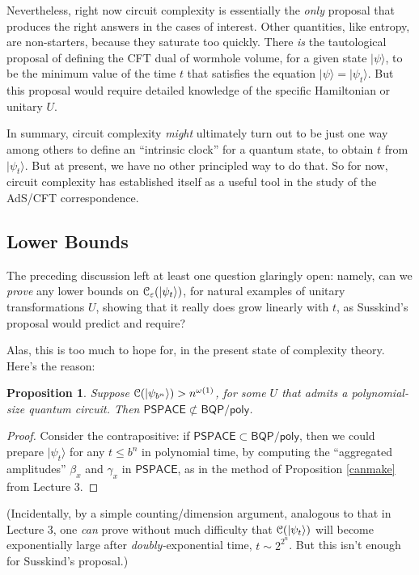 \documentclass[11pt]{report}
\theoremstyle{plain}
\newtheorem{proposition}[theorem]{Proposition}
\theoremstyle{definition}
\newcommand{\eps}{\varepsilon}
\renewcommand{\ket}[1]{|#1\rangle}
\begin{document}
Nevertheless, right now circuit complexity is essentially the {\em only} proposal that produces the right answers in the cases of interest.  Other quantities, like entropy, are non-starters, because they saturate too quickly.  There {\em is} the tautological proposal of defining the CFT dual of wormhole volume, for a given state $\ket{\psi}$, to be the minimum value of the time $t$ that satisfies the equation $\ket{\psi}=\ket{\psi_t}$.  But this proposal would require detailed knowledge of the specific Hamiltonian or unitary $U$.

In summary, circuit complexity {\em might} ultimately turn out to be just one way among others to define an ``intrinsic clock'' for a quantum state, to obtain $t$ from $\ket{\psi_t}$.  But at present, we have no other principled way to do that.  So for now, circuit complexity has established itself as a useful tool in the study of the AdS/CFT correspondence.

\subsection{Lower Bounds}

The preceding discussion left at least one question glaringly open: namely, can we \emph{prove} any lower bounds on ${\cal C}_\eps(\ket{\psi_t})$, for natural examples of unitary transformations $U$, showing that it really does grow linearly with $t$, as Susskind's proposal would predict and require?

Alas, this is too much to hope for, in the present state of complexity theory.  Here's the reason:

\begin{proposition}
\label{nope}
Suppose ${\cal C}(\ket{\psi_{b^n}}) > n^{\omega(1)}$, for some $U$ that admits a polynomial-size quantum circuit.  Then $\mathsf{PSPACE} \not\subset \mathsf{BQP/poly}$.
\end{proposition}
\begin{proof}
Consider the contrapositive: if $\mathsf{PSPACE} \subset \mathsf{BQP/poly}$, then we could prepare $\ket{\psi_{t}}$ for any $t\leq b^n$ in polynomial time, by computing the ``aggregated amplitudes'' $\beta_x$ and $\gamma_x$ in $\mathsf{PSPACE}$, as in the method of Proposition \ref{canmake} from Lecture 3.
\end{proof}

(Incidentally, by a simple counting/dimension argument, analogous to that in Lecture 3, one {\em can} prove without much difficulty that ${\cal C}(\ket{\psi_t})$ will become exponentially large after {\em doubly-}exponential time, $t\sim 2^{2^n}$.  But this isn't enough for Susskind's proposal.)
\end{document}
